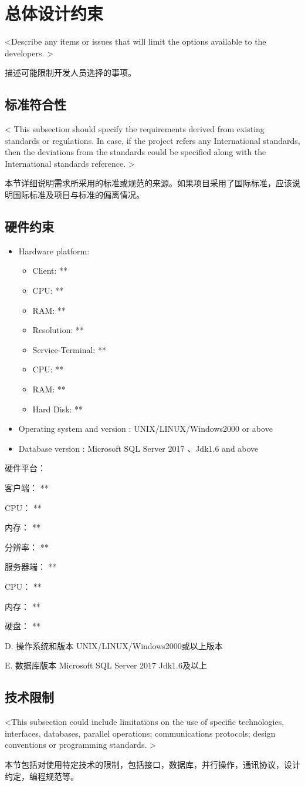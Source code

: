 \chapter{总体设计约束}
<Describe any items or issues that will limit the options available to the developers. >

描述可能限制开发人员选择的事项。
 
\section{标准符合性}
< This subsection should specify the requirements derived from existing standards or regulations. In case, if the project refers any International standards, then the deviations from the standards could be specified along with the International standards reference. >

本节详细说明需求所采用的标准或规范的来源。如果项目采用了国际标准，应该说明国际标准及项目与标准的偏离情况。

\section{硬件约束}
\begin{itemize}
\item Hardware platform:
\begin{itemize}
\item Client: **
\item CPU: **
\item RAM: **
\item Resolution: **
\item Service-Terminal: **
\item CPU: **
\item RAM: **
\item Hard Disk: **
\end{itemize}
\item Operating system and version : UNIX/LINUX/Windows2000 or above
\item Database version : Microsoft SQL Server 2017 、Jdk1.6 and above
\end{itemize}

硬件平台：

客户端： **

CPU： **

内存： **

分辨率： **

服务器端： **

CPU： **

内存： **

硬盘： **

D. 操作系统和版本 UNIX/LINUX/Windows2000或以上版本

E. 数据库版本 Microsoft SQL Server 2017  Jdk1.6及以上

\section{技术限制}
<This subsection could include limitations on the use of specific technologies, interfaces, databases, parallel operations; communications protocols; design conventions or programming standards. >

本节包括对使用特定技术的限制，包括接口，数据库，并行操作，通讯协议，设计约定，编程规范等。
